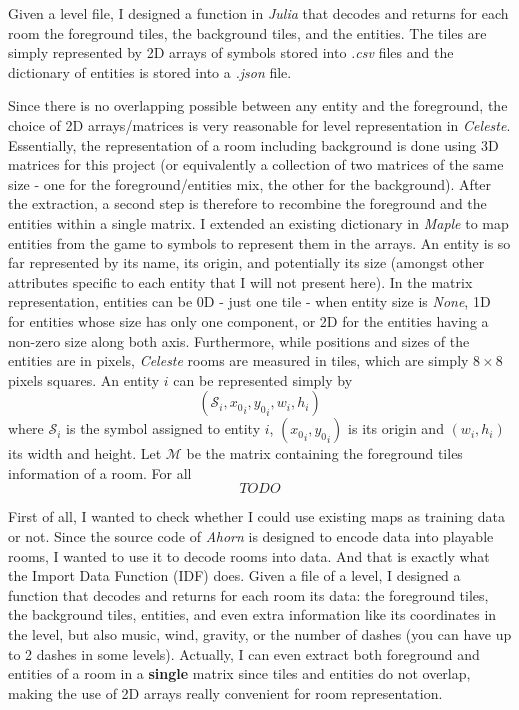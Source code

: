 \documentclass{article}
\newcommand{\Celeste}{\textit{Celeste} }
\newcommand{\Celnosp}{\textit{Celeste}}
\begin{document}
\noindent Given a level file, I designed a function in \textit{Julia} that decodes and returns for each room the foreground tiles, the background tiles, and the entities. The tiles are simply represented by 2D arrays of symbols stored into \textit{.csv} files and the dictionary of entities is stored into a \textit{.json} file.

\noindent Since there is no overlapping possible between any entity and the foreground, the choice of 2D arrays/matrices is very reasonable for level representation in \Celnosp. Essentially, the representation of a room including background is done using 3D matrices for this project (or equivalently a collection of two matrices of the same size - one for the foreground/entities mix, the other for the background). After the extraction, a second step is therefore to recombine the foreground and the entities within a single matrix. I extended an existing dictionary in \textit{Maple} to map entities from the game to symbols to represent them in the arrays. An entity is so far represented by its name, its origin, and potentially its size (amongst other attributes specific to each entity that I will not present here). In the matrix representation, entities can be 0D - just one tile - when entity size is \textit{None}, 1D for entities whose size has only one component, or 2D for the entities having a non-zero size along both axis. Furthermore, while positions and sizes of the entities are in pixels, \Celeste rooms are measured in tiles, which are simply $8 \times 8$ pixels squares. An entity $i$ can be represented simply by $$(\mathcal{S}_i, {x_0}_i, {y_0}_i, w_i, h_i)$$ where $\mathcal{S}_i$ is the symbol assigned to entity $i$, $({x_0}_i, {y_0}_i)$ is its origin and $(w_i, h_i)$ its width and height. Let $\mathcal{M}$ be the matrix containing the foreground tiles information of a room. For all $$TODO$$

First of all, I wanted to check whether I could use existing maps as training data or not. Since the source code of \textit{Ahorn} is designed to encode data into playable rooms, I wanted to use it to decode rooms into data. 
And that is exactly what the Import Data Function (IDF) does. Given a file of a level, I designed a function that decodes and returns for each room its data: the foreground tiles, the background tiles, entities, and even extra information like its coordinates in the level, but also music, wind, gravity, or the number of dashes (you can have up to 2 dashes in some levels). Actually, I can even extract both foreground and entities of a room in a \textbf{single} matrix since tiles and entities do not overlap, making the use of 2D arrays really convenient for room representation.
\end{document}
